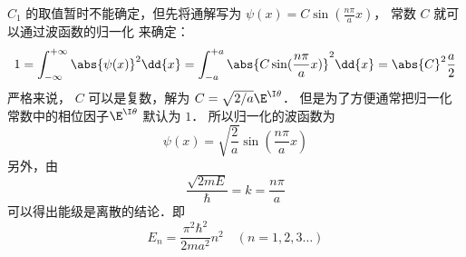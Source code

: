$C_1$ 的取值暂时不能确定，但先将通解写为 $\psi(x) = C\sin(\frac{n\pi }{a}x)$， 常数 $C$ 就可以通过波函数的归一化%
来确定：
\begin{equation}
1 = \int_{-\infty }^{+\infty } \abs{\psi(x)}^2 \dd{x}  = \int_{-a}^{+a} \abs{C\sin(\frac{n\pi }{a} x)}^2 \dd{x}  = \abs{C}^2 \frac{a}{2}
\end{equation}
严格来说， $C$ 可以是复数，解为 $C = \sqrt{2/a} \E^{\I\theta}$． 但是为了方便通常把归一化常数中的相位因子$\E^{\I\theta}$ 默认为 $1$． 所以归一化的波函数为
\begin{equation}
\psi(x) = \sqrt{\frac{2}{a}} \sin(\frac{n\pi }{a}x)
\end{equation}
另外，由
\begin{equation}
\frac{\sqrt{2mE}}{\hbar} = k = \frac{n\pi }{a}
\end{equation}
可以得出能级是离散的结论．即
\begin{equation}
E_n = \frac{\pi^2\hbar^2}{2m a^2} n^2 \quad (n = 1,2,3\dots)
\end{equation}

